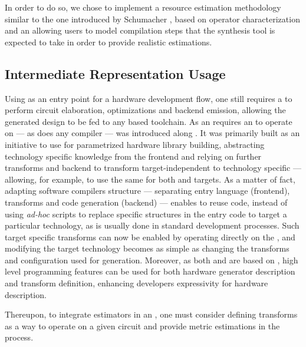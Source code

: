     In order to do so, we chose to implement a resource estimation methodology similar to the one introduced by Schumacher \etal{} \cite{schumacher_fast_2008}, based on operator characterization and an  allowing users to model compilation steps that the synthesis tool is expected to take in order to provide realistic estimations.

    \subsection{Intermediate Representation Usage}
    \label{ch.estimators:sec.resource-timing:ssec.ir}

        Using \chisel{} as an entry point for a hardware development flow, one still requires a  to perform circuit elaboration, optimizations and backend emission, allowing the generated design to be fed to any  based toolchain.
        As an  requires an  to operate on --- as does any compiler ---  \cite{li_2016_specification}\cite{izraelevitz_2017_reusability} was introduced along \chisel{}.
        It was primarily built as an initiative to use  for parametrized hardware library building, abstracting technology specific knowledge from the  frontend and relying on further transforms and backend to transform target-independent  to technology specific  --- allowing, for example, to use the same \chisel{} for both  and  targets.
        As a matter of fact, adapting software compilers structure --- \ie separating entry language (frontend),  transforms and code generation (backend) --- enables to reuse  code, instead of using {\it ad-hoc} scripts to replace specific structures in the entry code to target a particular technology, as is usually done in standard development processes.
        Such target specific transforms can now be enabled by operating directly on the , and modifying the target technology becomes as simple as changing the transforms and configuration used for generation.
        Moreover, as both \chisel{} and \firrtl{} are based on \scala, high level programming features can be used for both hardware generator description and transform definition, enhancing developers expressivity for hardware description.

        Thereupon, to integrate estimators in an , one must consider defining  transforms as a way to operate on a given circuit and provide metric estimations in the process.


